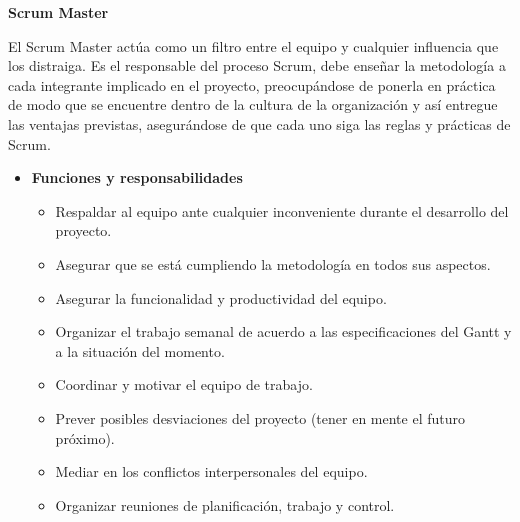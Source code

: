     
        \textbf{Scrum Master}
        
        El Scrum Master actúa como un filtro entre el equipo y cualquier influencia que los distraiga.
        Es el responsable del proceso Scrum, debe enseñar la metodología a cada integrante implicado en el proyecto, preocupándose de ponerla en práctica de modo que se encuentre dentro de la cultura de la organización y así entregue las ventajas previstas, asegurándose de que cada uno siga las reglas y prácticas de Scrum.
        	\begin{itemize}
			\item \textbf{Funciones y responsabilidades}
            	\begin{itemize}
				\item Respaldar al equipo ante cualquier inconveniente durante el desarrollo del proyecto.
                \item Asegurar que se está cumpliendo la metodología en todos sus aspectos.
                \item Asegurar la funcionalidad y productividad del equipo.
                \item Organizar el trabajo semanal de acuerdo a las especificaciones del Gantt y a la situación del momento.
                \item Coordinar y motivar el equipo de trabajo.
                \item Prever posibles desviaciones del proyecto (tener en mente el futuro próximo).
                \item Mediar en los conflictos interpersonales del equipo.
                \item Organizar reuniones de planificación, trabajo y control.
				\end{itemize}
             

\end{itemize}
